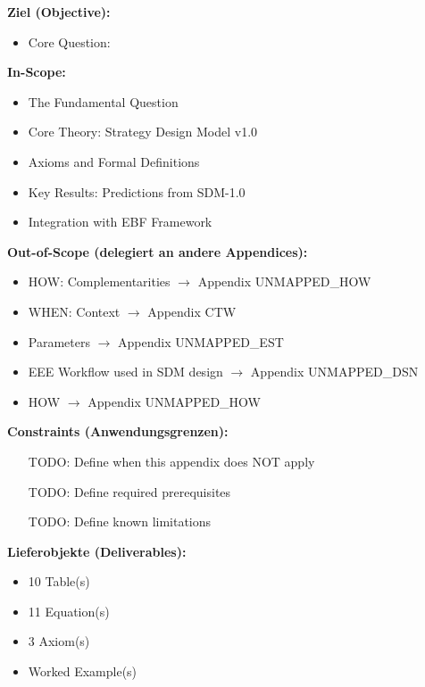 \begin{tcolorbox}[
    colback=orange!5!white,
    colframe=orange!75!black,
    title={\textbf{Appendix Scope: Ziel / In-Scope / Out-of-Scope / Constraints}},
    fonttitle=\bfseries
]

\textbf{Ziel (Objective):}
\begin{itemize}[nosep]
    \item Core Question:
\end{itemize}

\textbf{In-Scope:}
\begin{itemize}[nosep]
    \item The Fundamental Question
    \item Core Theory: Strategy Design Model v1.0
    \item Axioms and Formal Definitions
    \item Key Results: Predictions from SDM-1.0
    \item Integration with EBF Framework
\end{itemize}

\textbf{Out-of-Scope (delegiert an andere Appendices):}
\begin{itemize}[nosep]
    \item HOW: Complementarities $\rightarrow$ Appendix UNMAPPED_HOW
    \item WHEN: Context $\rightarrow$ Appendix CTW
    \item Parameters $\rightarrow$ Appendix UNMAPPED_EST
    \item EEE Workflow used in SDM design $\rightarrow$ Appendix UNMAPPED_DSN
    \item HOW $\rightarrow$ Appendix UNMAPPED_HOW
\end{itemize}

\textbf{Constraints (Anwendungsgrenzen):}
\begin{itemize}[nosep]
    \item [TODO: Define when this appendix does NOT apply]
    \item [TODO: Define required prerequisites]
    \item [TODO: Define known limitations]
\end{itemize}

\textbf{Lieferobjekte (Deliverables):}
\begin{itemize}[nosep]
    \item 10 Table(s)
    \item 11 Equation(s)
    \item 3 Axiom(s)
    \item Worked Example(s)
\end{itemize}

\end{tcolorbox}


